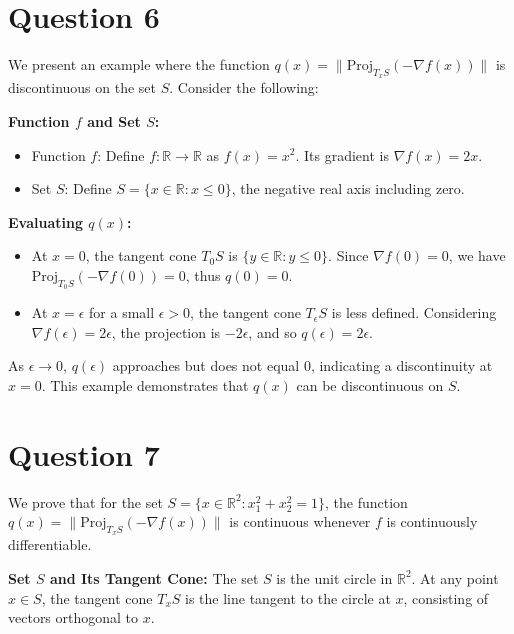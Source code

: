 \documentclass[12p]{article}
\begin{document}
\section*{Question 6} 

We present an example where the function \( q(x) = \lVert \text{Proj}_{T_xS}(-\nabla f(x)) \rVert \) is discontinuous on the set \( S \). Consider the following:

\textbf{Function \( f \) and Set \( S \):}
\begin{itemize}
    \item Function \( f \): Define \( f: \mathbb{R} \rightarrow \mathbb{R} \) as \( f(x) = x^2 \). Its gradient is \( \nabla f(x) = 2x \).
    \item Set \( S \): Define \( S = \{x \in \mathbb{R} : x \leq 0\} \), the negative real axis including zero.
\end{itemize}

\textbf{Evaluating \( q(x) \):}
\begin{itemize}
    \item At \( x = 0 \), the tangent cone \( T_0S \) is \( \{y \in \mathbb{R} : y \leq 0\} \). Since \( \nabla f(0) = 0 \), we have \( \text{Proj}_{T_0S}(-\nabla f(0)) = 0 \), thus \( q(0) = 0 \).
    \item At \( x = \epsilon \) for a small \( \epsilon > 0 \), the tangent cone \( T_\epsilon S \) is less defined. Considering \( \nabla f(\epsilon) = 2\epsilon \), the projection is \( -2\epsilon \), and so \( q(\epsilon) = 2\epsilon \).
\end{itemize}

As \( \epsilon \rightarrow 0 \), \( q(\epsilon) \) approaches but does not equal 0, indicating a discontinuity at \( x = 0 \). This example demonstrates that \( q(x) \) can be discontinuous on \( S \).

\section*{Question 7} 

We prove that for the set \( S = \{x \in \mathbb{R}^2 : x_1^2 + x_2^2 = 1\} \), the function \( q(x) = \lVert \text{Proj}_{T_xS}(-\nabla f(x)) \rVert \) is continuous whenever \( f \) is continuously differentiable.

\textbf{Set \( S \) and Its Tangent Cone:}
The set \( S \) is the unit circle in \( \mathbb{R}^2 \). At any point \( x \in S \), the tangent cone \( T_xS \) is the line tangent to the circle at \( x \), consisting of vectors orthogonal to \( x \).
\end{document}
